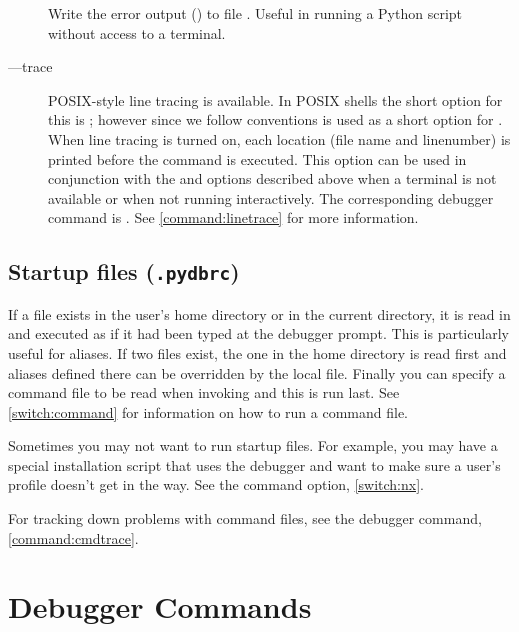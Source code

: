 \begin{description}
Write the error output
() to file . Useful in
 running a Python script without access to a terminal.

\item[--{}--trace]\label{switch:trace}

POSIX-style line tracing is available. In POSIX shells the short
option for this is ; however since we follow 
conventions  is used as a short option for
. When line tracing is turned on, each location (file
name and linenumber) is printed before the command is executed. This
option can be used in conjunction with the  and
 options described above when a terminal is not
available or when not running interactively. The corresponding
debugger command is . See
\ref{command:linetrace} for more information.

\end{description}

\subsection{Startup files ({\tt .pydbrc})\label{subsection-startup-files}}

If a file 
 exists
in the user's home directory or in the current directory, it is read
in and executed as if it had been typed at the debugger prompt.  This
is particularly useful for aliases.  If two files exist, the one in
the home directory is read first and aliases defined there can be
overridden by the local file. Finally you can specify a command file
to be read when invoking  and this is run last. See
\ref{switch:command} for information on how to run a command file.

Sometimes you may not want to run startup files. For example,
you may have a special installation script that uses the debugger and
want to make sure a user's profile doesn't get in the way. See
the  command option, \ref{switch:nx}.

For tracking down problems with command files, see the  debugger command, \ref{command:cmdtrace}.

\section{Debugger Commands \label{pydb-commands}}

